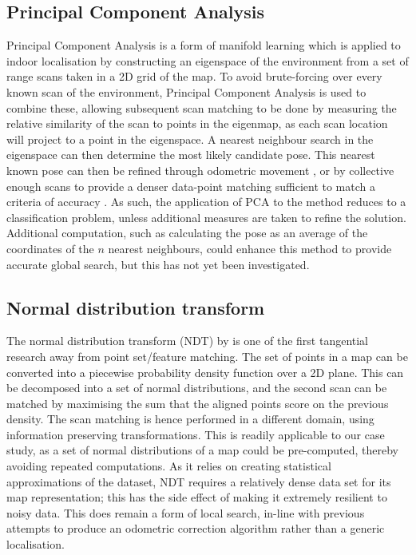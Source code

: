 \documentclass[authoryearcitations]{UoYCSproject}
\begin{document}
\subsection{Principal Component Analysis}
Principal Component Analysis is a form of manifold learning which is applied to indoor localisation by constructing an eigenspace of the environment from a set of range scans taken in a 2D grid of the map. To avoid brute-forcing over every known scan of the environment, Principal Component Analysis is used to combine these, allowing subsequent scan matching to be done by measuring the relative similarity of the scan to points in the eigenmap, as each scan location will project to a point in the eigenspace. A nearest neighbour search in the eigenspace can then determine the most likely candidate pose. This nearest known pose can then be refined through odometric movement \cite{Pourraz1999-nu}, or by collective enough scans to provide a denser data-point matching sufficient to match a criteria of accuracy \citet{Pourraz1999-nu}. As such, the application of PCA to the method reduces to a classification problem, unless additional measures are taken to refine the solution. Additional computation, such as calculating the pose as an average of the coordinates of the $n$ nearest neighbours, could enhance this method to provide accurate global search, but this has not yet been investigated. 

\subsection{Normal distribution transform}
The normal distribution transform (NDT) by \citet{Biber2003-kb} is one of the first tangential research away from point set/feature matching. The set of points in a map can be converted into a piecewise probability density function over a 2D plane. This can be decomposed into a set of normal distributions, and the second scan can be matched by maximising the sum that the aligned points score on the previous density. The scan matching is hence performed in a different domain, using information preserving transformations. This is readily applicable to our case study, as a set of normal distributions of a map could be pre-computed, thereby avoiding repeated computations. As it relies on creating statistical approximations of the dataset, NDT requires a relatively dense data set for its map representation; this has the side effect of making it extremely resilient to noisy data. This does remain a form of local search, in-line with previous attempts to produce an odometric correction algorithm rather than a generic localisation. 
\end{document}
